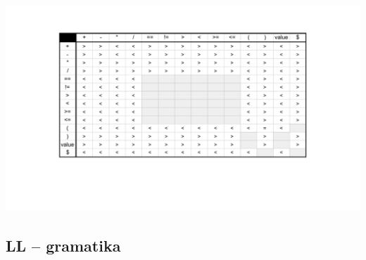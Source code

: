 \documentclass[a4paper, 12pt]{article}
\begin{document}
\includegraphics[width=\textwidth,keepaspectratio]{Precedence_table.pdf}


\newpage

\subsection{LL -- gramatika}
\end{document}
